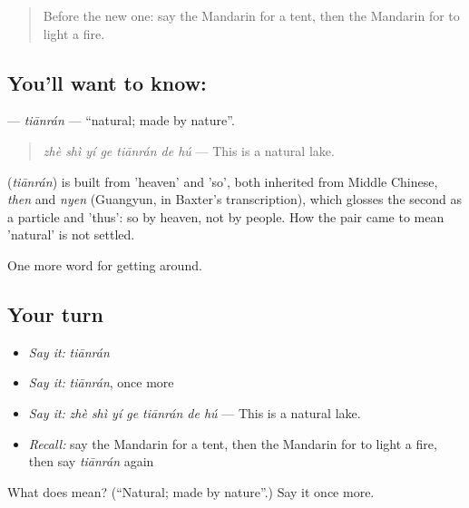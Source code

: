 \label{lesson:ZH-C441-tianran}



\begin{quote}
Before the new one: say the Mandarin for a tent, then the Mandarin for to light a fire.
\end{quote}

\subsection*{You'll want to know: }
\textbf{} — \emph{tiānrán} — \textquotedblleft{}natural; made by nature\textquotedblright{}.

\begin{quote}
\emph{zhè shì yí ge tiānrán de hú} — This is a natural lake.
\end{quote}

\begin{cousinweb}
\textbf{} (\emph{tiānrán}) is built from  'heaven' and  'so', both inherited from Middle Chinese, \emph{then} and \emph{nyen} (Guangyun, in Baxter's transcription), which glosses the second as a particle and 'thus': so by heaven, not by people. How the pair came to mean 'natural' is not settled.
\end{cousinweb}

\begin{grammarlens}[title={What you've built}]
One more word for getting around.
\end{grammarlens}

\subsection*{Your turn}
\begin{itemize}
\raggedright
  \item \emph{Say it:} \emph{tiānrán}
  \item \emph{Say it:} \emph{tiānrán}, once more
  \item \emph{Say it:} \emph{zhè shì yí ge tiānrán de hú} — This is a natural lake.
  \item \emph{Recall:} say the Mandarin for a tent, then the Mandarin for to light a fire, then say \emph{tiānrán} again
\end{itemize}

\begin{tcolorbox}[breakable,colback=teal!4,colframe=teal!35!black,title={Before you move on}]
What does  mean? (\textquotedblleft{}Natural; made by nature\textquotedblright{}.) Say it once more.
\end{tcolorbox}
